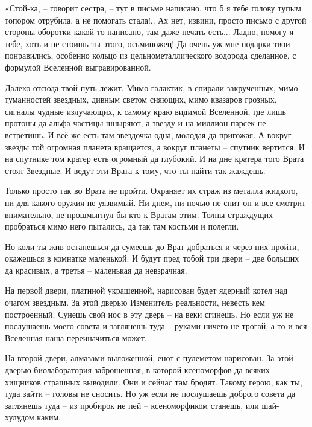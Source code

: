 \documentclass[ebook,oneside,final,openright]{memoir}
\begin{document}
\par
«Стой-ка, – говорит сестра, – тут в письме написано, что б я тебе голову тупым топором отрубила, а не помогать стала!.. Ах нет, извини, просто письмо с другой стороны оборотки какой-то написано, там даже печать есть... Ладно, помогу я тебе, хоть и не стоишь ты этого, осьминожец! Да очень уж мне подарки твои понравились, особенно кольцо из цельнометаллического водорода сделанное, с формулой Вселенной выгравированной.\par
\par
Далеко отсюда твой путь лежит. Мимо галактик, в спирали закрученных, мимо туманностей звездных, дивным светом сияющих, мимо квазаров грозных, сигналы чудные излучающих, к самому краю видимой Вселенной, где лишь протоны да альфа-частицы шныряют, а звезду и на миллион парсек не встретишь. И всё же есть там звездочка одна, молодая да пригожая. А вокруг звезды той огромная планета вращается, а вокруг планеты – спутник вертится. И на спутнике том кратер есть огромный да глубокий. И на дне кратера того Врата стоят Звездные. И ведут эти Врата к тому, что ты найти так жаждешь.\par
\par
Только просто так во Врата не пройти. Охраняет их страж из металла жидкого, ни для какого оружия не уязвимый. Ни днем, ни ночью не спит он и все смотрит внимательно, не прошмыгнул бы кто к Вратам этим. Толпы страждущих пробраться мимо него пытались, да так там костьми и полегли.\par
\par
Но коли ты жив останешься да сумеешь до Врат добраться и через них пройти, окажешься в комнатке маленькой. И будут пред тобой три двери – две больших да красивых, а третья – маленькая да невзрачная.\par
\par
На первой двери, платиной украшенной, нарисован будет ядерный котел над очагом звездным. За этой дверью Изменитель реальности, невесть кем построенный. Сунешь свой нос в эту дверь – на веки сгинешь. Но если уж не послушаешь моего совета и заглянешь туда – руками ничего не трогай, а то и вся Вселенная наша переиначиться может.\par
\par
На второй двери, алмазами выложенной, енот с пулеметом нарисован. За этой дверью биолаборатория заброшенная, в которой ксеноморфов да всяких хищников страшных выводили. Они и сейчас там бродят. Такому герою, как ты, туда зайти – головы не сносить. Но уж если не послушаешь доброго совета да заглянешь туда – из пробирок не пей – ксеноморфиком станешь, или шай-хулудом каким.\par
\end{document}
